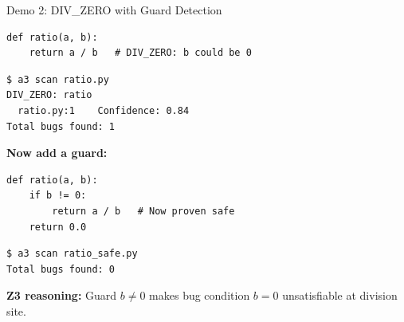 \documentclass[aspectratio=169]{beamer}
\begin{document}
\begin{frame}[fragile]{Demo 2: DIV\_ZERO with Guard Detection}

\begin{lstlisting}
def ratio(a, b):
    return a / b   # DIV_ZERO: b could be 0
\end{lstlisting}

\begin{lstlisting}[style=bash]
$ a3 scan ratio.py
DIV_ZERO: ratio
  ratio.py:1    Confidence: 0.84
Total bugs found: 1
\end{lstlisting}

\vspace{0.3em}
\textbf{Now add a guard:}
\begin{lstlisting}
def ratio(a, b):
    if b != 0:
        return a / b   # Now proven safe
    return 0.0
\end{lstlisting}

\begin{lstlisting}[style=bash]
$ a3 scan ratio_safe.py
Total bugs found: 0
\end{lstlisting}

\textbf{Z3 reasoning:} Guard $b \neq 0$ makes bug condition $b = 0$ unsatisfiable at division site.

\end{frame}
\end{document}

